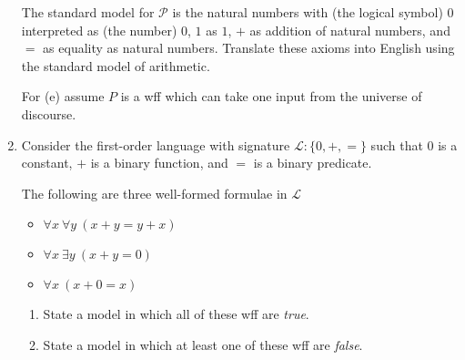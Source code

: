 \documentclass[11pt]{report}
\begin{document}
\begin{enumerate}
			The standard model for $\mathcal{P}$ is the natural numbers with (the logical symbol) $0$ interpreted as (the number) $0$, $1$ as $1$, $+$ as addition of natural numbers, and $=$ as equality as natural numbers. Translate these axioms into English using the standard model of arithmetic. 
			
			For (e) assume $P$ is a wff which can take one input from the universe of discourse. 
			
	\item Consider the first-order language with signature $\mathcal{L}: \{0, +, =\}$ such that $0$ is a constant, $+$ is a binary function, and $=$ is a binary predicate.
			
	The following are three well-formed formulae in $\mathcal{L}$
			
		\begin{itemize}
			\item $\forall x \ \forall y \ (x + y = y + x)$
			\item $\forall x \ \exists y \ (x + y = 0)$
			\item $\forall x \ (x + 0 = x)$
		\end{itemize}
		
		\begin{enumerate}
	  		\item State a model in which all of these wff are \textit{true}. 
	  		\item State a model in which at least one of these wff are \textit{false}.
		\end{enumerate}
	  

\end{enumerate}
	
\end{document}
